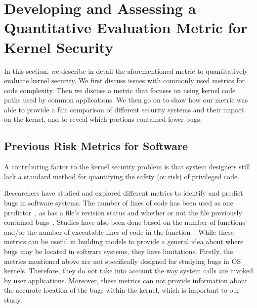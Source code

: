\section{Developing and Assessing a Quantitative Evaluation Metric for
Kernel Security}
\label{sec.metric}


In this section, we describe in detail the aforementioned metric to 
quantitatively evaluate kernel security. We first discuss issues with
commonly used metrics for code complexity. Then we discuss a metric that
focuses on using kernel code paths used by common applications.  We
then go on to show how our metric was able to provide a fair comparison of 
different security systems and their impact on the kernel, 
and to reveal which portions contained fewer bugs.

\subsection{Previous Risk Metrics for Software}

A contributing factor to the kernel security problem is that system
designers 
still lack a standard method for quantifying the safety (or risk) of
privileged code.   

Researchers have studied and explored different metrics to identify and
predict bugs in software systems. 
The number of lines of code has been used as one 
predictor~\cite{Bug-Location}, as has a file's revision status and 
whether or not the file previously contained bugs~\cite{lewis2013does,
Bug-Location}. Studies have also been done based on 
the number of functions and/or the number of executable lines of code in
the function~\cite{Mining-Metrics}. 
While these metrics can be useful in building models to provide a general
idea about 
where bugs may be located in software systems, they have limitations. 
Firstly, the metrics mentioned above are not specifically designed for
studying bugs in OS kernels. 
Therefore, they do not take into account the way system calls are invoked
by user applications. 
Moreover, these metrics can not provide information about the accurate
location of the bugs within the kernel, 
which is important to our study.

